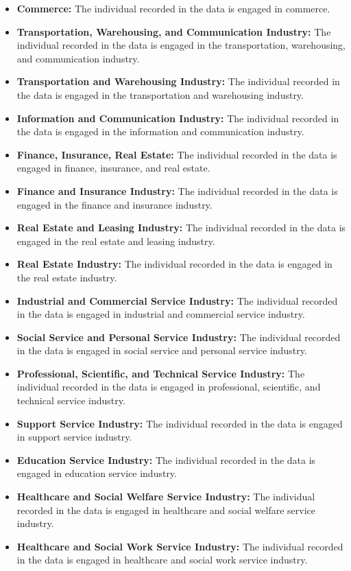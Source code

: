 \documentclass[twocolumn]{article}
\begin{document}
\begin{itemize}
    \item \textbf{Commerce:} The individual recorded in the data is engaged in commerce.
    \item \textbf{Transportation, Warehousing, and Communication Industry:} The individual recorded in the data is engaged in the transportation, warehousing, and communication industry.
    \item \textbf{Transportation and Warehousing Industry:} The individual recorded in the data is engaged in the transportation and warehousing industry.
    \item \textbf{Information and Communication Industry:} The individual recorded in the data is engaged in the information and communication industry.
    \item \textbf{Finance, Insurance, Real Estate:} The individual recorded in the data is engaged in finance, insurance, and real estate.
    \item \textbf{Finance and Insurance Industry:} The individual recorded in the data is engaged in the finance and insurance industry.
    \item \textbf{Real Estate and Leasing Industry:} The individual recorded in the data is engaged in the real estate and leasing industry.
    \item \textbf{Real Estate Industry:} The individual recorded in the data is engaged in the real estate industry.
    \item \textbf{Industrial and Commercial Service Industry:} The individual recorded in the data is engaged in industrial and commercial service industry.
    \item \textbf{Social Service and Personal Service Industry:} The individual recorded in the data is engaged in social service and personal service industry.
    \item \textbf{Professional, Scientific, and Technical Service Industry:} The individual recorded in the data is engaged in professional, scientific, and technical service industry.
    \item \textbf{Support Service Industry:} The individual recorded in the data is engaged in support service industry.
    \item \textbf{Education Service Industry:} The individual recorded in the data is engaged in education service industry.
    \item \textbf{Healthcare and Social Welfare Service Industry:} The individual recorded in the data is engaged in healthcare and social welfare service industry.
    \item \textbf{Healthcare and Social Work Service Industry:} The individual recorded in the data is engaged in healthcare and social work service industry.

\end{itemize}
\end{document}
